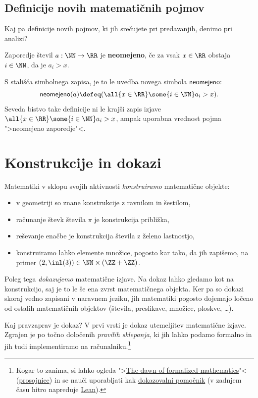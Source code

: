 \subsection{Definicije novih matematičnih pojmov}

Kaj pa definicije novih pojmov, ki jih srečujete pri predavanjih, denimo pri analizi?

\begin{definicija}
  Zaporedje števil $a : \NN \to \RR$ je \textbf{neomejeno}, če za vsak $x \in \RR$ obstaja $i \in \NN$, da je $a_i > x$.
\end{definicija}

\noindent
S stališča simbolnega zapisa, je to le uvedba novega simbola $\mathsf{neomejeno}$:
%
\begin{equation*}
  \mathsf{neomejeno}(a) \defeq (\all{x \in \RR} \some{i \in \NN} a_i > x).
\end{equation*}
%
Seveda bistvo take definicije ni le krajši zapis izjave $\all{x \in \RR} \some{i \in \NN} a_i > x$, ampak uporabna vrednost pojma ">neomejeno zaporedje"<.


\section{Konstrukcije in dokazi}

Matematiki v sklopu svojih aktivnosti \emph{konstruiramo} matematične objekte:
%
\begin{itemize}
\item v geometriji so znane konstrukcije z ravnilom in šestilom,
\item računanje števk števila $\pi$ je konstrukcija približka,
\item reševanje enačbe je konstrukcija števila z želeno lastnostjo,
\item konstruiramo lahko elemente množice, pogosto kar tako, da jih zapišemo, na primer $(2, \inl(3)) \in \NN \times (\ZZ + \ZZ)$.
\end{itemize}

Poleg tega \emph{dokazujemo} matematične izjave. Na dokaz lahko gledamo kot na konstrukcijo, saj je to le še ena zvrst matematičnega objekta. Ker pa so dokazi skoraj vedno zapisani v naravnem jeziku, jih matematiki pogosto dojemajo ločeno od ostalih matematičnih objektov (števila, preslikave, množice, ploskve, \dots).

Kaj pravzaprav je dokaz? V prvi vrsti je dokaz utemeljitev matematične izjave. Zgrajen je po točno določenih \emph{pravilih sklepanja}, ki jih lahko podamo formalno in jih tudi implementiramo na računalniku.\footnote{Kogar to zanima, si lahko ogleda ">\href{https://youtu.be/Z500sma3h90}{The dawn of formalized mathematics}"< (\href{https://www.icloud.com/keynote/0Gkr1yM7XY-31aQleWf-fiW7A}{prosojnice}) in se nauči uporabljati kak  \href{https://ncatlab.org/nlab/show/proof+assistant}{dokazovalni pomočnik} (v zadnjem času hitro napreduje \href{https://leanprover.github.io}{Lean}).
}

